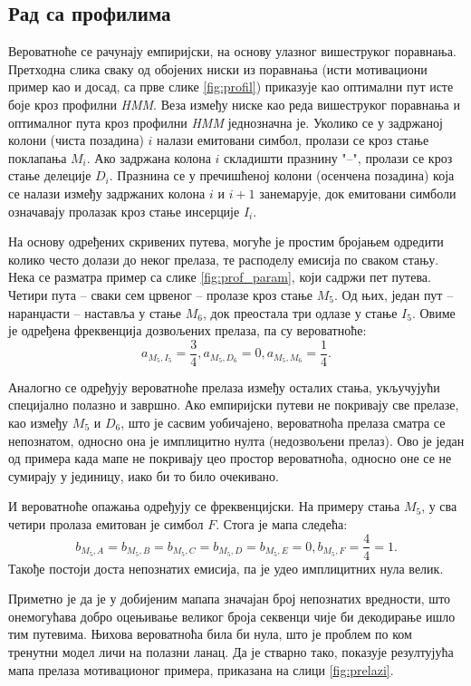 \documentclass[12pt,oneside]{memoir}
\begin{document}
\begin{CJK}{UTF8}{ipxm}
\section{Рад са профилима}
Вероватноће се рачунају емпиријски, на основу улазног вишеструког поравнања. Претходна слика сваку од обојених ниски из поравнања (исти мотивациони пример као и досад, са прве слике \ref{fig:profil}) приказује као оптимални пут исте боје кроз профилни \textit{HMM}. Веза између ниске као реда вишеструког поравнања и оптималног пута кроз профилни \textit{HMM} једнозначна је. Уколико се у задржаној колони (чиста позадина) $i$ налази емитовани симбол, пролази се кроз стање поклапања $M_i$. Ако задржана колона $i$ складишти празнину "--", пролази се кроз стање делеције $D_i$. Празнина се у пречишћеној колони (осенчена позадина) која се налази између задржаних колона $i$ и $i+1$ занемарује, док емитовани симболи означавају пролазак кроз стање инсерције $I_i$.

На основу одређених скривених путева, могуће је простим бројањем одредити колико често долази до неког прелаза, те расподелу емисија по сваком стању. Нека се разматра пример са слике \ref{fig:prof_param}, који садржи пет путева. Четири пута -- сваки сем црвеног -- пролазе кроз стање $M_5$. Од њих, један пут -- наранџасти -- наставља у стање $M_6$, док преостала три одлазе у стање $I_5$. Овиме је одређена фреквенција дозвољених прелаза, па су вероватноће: $$a_{M_5, I_5} = \frac{3}{4}, a_{M_5, D_6} = 0, a_{M_5, M_6} = \frac{1}{4}.$$

Аналогно се одређују вероватноће прелаза између осталих стања, укључујући специјално полазно и завршно. Ако емпиријски путеви не покривају све прелазе, као између $M_5$ и $D_6$, што је сасвим уобичајено, вероватноћа прелаза сматра се непознатом, односно она је имплицитно нулта (недозвољени прелаз). Ово је један од примера када мапе не покривају цео простор вероватноћа, односно оне се не сумирају у јединицу, иако би то било очекивано.

И вероватноће опажања одређују се фреквенцијски. На примеру стања $M_5$, у сва четири пролаза емитован је симбол $F$. Стога је мапа следећа: $$b_{M_5, A} = b_{M_5, B} = b_{M_5, C} = b_{M_5, D}= b_{M_5, E} = 0, b_{M_5, F} = \frac{4}{4} = 1.$$ Такође постоји доста непознатих емисија, па је удео имплицитних нула велик.

Приметно је да је у добијеним мапапа значајан број непознатих вредности, што онемогућава добро оцењивање великог броја секвенци чије би декодирање ишло тим путевима. Њихова вероватноћа била би нула, што је проблем по ком тренутни модел личи на полазни ланац. Да је стварно тако, показује резултујућа мапа прелаза мотивационог примера, приказана на слици \ref{fig:prelazi}.


\end{CJK}
\end{document}
